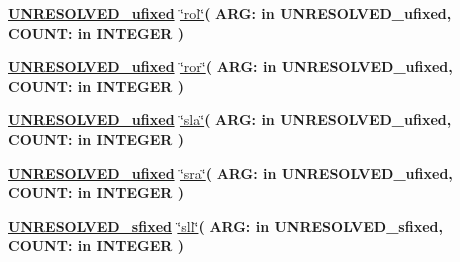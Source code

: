 \begin{DoxyCompactItemize}
\item 
{\bfseries {\bfseries {\bfseries \hyperlink{classfixed__pkg_ae78bc2b36d22f6abeac163955e8a587d}{U\+N\+R\+E\+S\+O\+L\+V\+E\+D\+\_\+ufixed}} \textcolor{vhdlchar}{ }}} \hyperlink{classfixed__pkg_a0b1d7e62fa044f078a21134a782f676b}{\char`\"{}rol\char`\"{}}{\bfseries  ( }{\bfseries \textcolor{vhdlchar}{A\+R\+G\+: }\textcolor{stringliteral}{in }\textcolor{vhdlchar}{U\+N\+R\+E\+S\+O\+L\+V\+E\+D\+\_\+ufixed}}{\bfseries  , \textcolor{vhdlchar}{C\+O\+U\+N\+T\+: }\textcolor{stringliteral}{in }{\bfseries \textcolor{comment}{I\+N\+T\+E\+G\+E\+R}\textcolor{vhdlchar}{ }}}{\bfseries  )} 
\item 
{\bfseries {\bfseries {\bfseries \hyperlink{classfixed__pkg_ae78bc2b36d22f6abeac163955e8a587d}{U\+N\+R\+E\+S\+O\+L\+V\+E\+D\+\_\+ufixed}} \textcolor{vhdlchar}{ }}} \hyperlink{classfixed__pkg_a9c6bda0792f388964062276c995926d6}{\char`\"{}ror\char`\"{}}{\bfseries  ( }{\bfseries \textcolor{vhdlchar}{A\+R\+G\+: }\textcolor{stringliteral}{in }\textcolor{vhdlchar}{U\+N\+R\+E\+S\+O\+L\+V\+E\+D\+\_\+ufixed}}{\bfseries  , \textcolor{vhdlchar}{C\+O\+U\+N\+T\+: }\textcolor{stringliteral}{in }{\bfseries \textcolor{comment}{I\+N\+T\+E\+G\+E\+R}\textcolor{vhdlchar}{ }}}{\bfseries  )} 
\item 
{\bfseries {\bfseries {\bfseries \hyperlink{classfixed__pkg_ae78bc2b36d22f6abeac163955e8a587d}{U\+N\+R\+E\+S\+O\+L\+V\+E\+D\+\_\+ufixed}} \textcolor{vhdlchar}{ }}} \hyperlink{classfixed__pkg_a58f9725ae8b23955d8f3982b8bf686bf}{\char`\"{}sla\char`\"{}}{\bfseries  ( }{\bfseries \textcolor{vhdlchar}{A\+R\+G\+: }\textcolor{stringliteral}{in }\textcolor{vhdlchar}{U\+N\+R\+E\+S\+O\+L\+V\+E\+D\+\_\+ufixed}}{\bfseries  , \textcolor{vhdlchar}{C\+O\+U\+N\+T\+: }\textcolor{stringliteral}{in }{\bfseries \textcolor{comment}{I\+N\+T\+E\+G\+E\+R}\textcolor{vhdlchar}{ }}}{\bfseries  )} 
\item 
{\bfseries {\bfseries {\bfseries \hyperlink{classfixed__pkg_ae78bc2b36d22f6abeac163955e8a587d}{U\+N\+R\+E\+S\+O\+L\+V\+E\+D\+\_\+ufixed}} \textcolor{vhdlchar}{ }}} \hyperlink{classfixed__pkg_a680f13e66a7cabdb18b78049f2041335}{\char`\"{}sra\char`\"{}}{\bfseries  ( }{\bfseries \textcolor{vhdlchar}{A\+R\+G\+: }\textcolor{stringliteral}{in }\textcolor{vhdlchar}{U\+N\+R\+E\+S\+O\+L\+V\+E\+D\+\_\+ufixed}}{\bfseries  , \textcolor{vhdlchar}{C\+O\+U\+N\+T\+: }\textcolor{stringliteral}{in }{\bfseries \textcolor{comment}{I\+N\+T\+E\+G\+E\+R}\textcolor{vhdlchar}{ }}}{\bfseries  )} 
\item 
{\bfseries {\bfseries {\bfseries \hyperlink{classfixed__pkg_aa723b28a027c3c0f9bca02d75e8df4d6}{U\+N\+R\+E\+S\+O\+L\+V\+E\+D\+\_\+sfixed}} \textcolor{vhdlchar}{ }}} \hyperlink{classfixed__pkg_a12aadf943c6794fc10b23db44db79889}{\char`\"{}sll\char`\"{}}{\bfseries  ( }{\bfseries \textcolor{vhdlchar}{A\+R\+G\+: }\textcolor{stringliteral}{in }\textcolor{vhdlchar}{U\+N\+R\+E\+S\+O\+L\+V\+E\+D\+\_\+sfixed}}{\bfseries  , \textcolor{vhdlchar}{C\+O\+U\+N\+T\+: }\textcolor{stringliteral}{in }{\bfseries \textcolor{comment}{I\+N\+T\+E\+G\+E\+R}\textcolor{vhdlchar}{ }}}{\bfseries  )} 

\end{DoxyCompactItemize}
